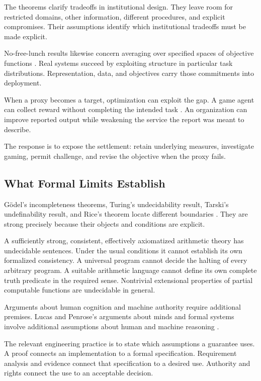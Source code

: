 The theorems clarify tradeoffs in institutional design. They leave room for restricted domains, other information, different procedures, and explicit compromises. Their assumptions identify which institutional tradeoffs must be made explicit.

No-free-lunch results likewise concern averaging over specified spaces of objective functions \cite{wolpert1997no}. Real systems succeed by exploiting structure in particular task distributions. Representation, data, and objectives carry those commitments into deployment.

When a proxy becomes a target, optimization can exploit the gap. A game agent can collect reward without completing the intended task \cite{amodei2016concrete}. An organization can improve reported output while weakening the service the report was meant to describe.

The response is to expose the settlement: retain underlying measures, investigate gaming, permit challenge, and revise the objective when the proxy fails.

\subsection{What Formal Limits Establish}

Gödel's incompleteness theorems, Turing's undecidability result, Tarski's undefinability result, and Rice's theorem locate different boundaries \cite{godel1931,turing1936,tarski1936wahrheitsbegriff,rice1953classes}. They are strong precisely because their objects and conditions are explicit.

A sufficiently strong, consistent, effectively axiomatized arithmetic theory has undecidable sentences. Under the usual conditions it cannot establish its own formalized consistency. A universal program cannot decide the halting of every arbitrary program. A suitable arithmetic language cannot define its own complete truth predicate in the required sense. Nontrivial extensional properties of partial computable functions are undecidable in general.

Arguments about human cognition and machine authority require additional premises. Lucas and Penrose's arguments about minds and formal systems involve additional assumptions about human and machine reasoning \cite{lucas1961minds,penrose1989emperor}.

The relevant engineering practice is to state which assumptions a guarantee uses. A proof connects an implementation to a formal specification. Requirement analysis and evidence connect that specification to a desired use. Authority and rights connect the use to an acceptable decision.

